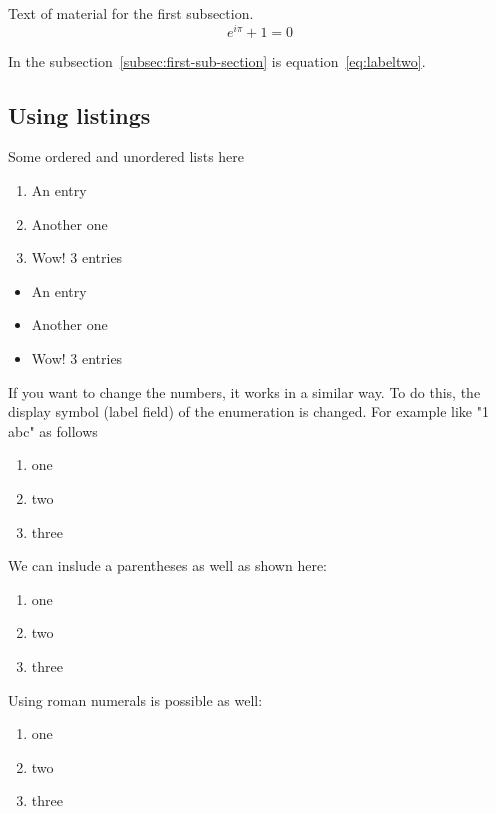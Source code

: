 \documentclass[12]{article}
\begin{document}
    Text of material for the first subsection.
    \begin{equation}
      e^{i\pi}+1 = 0
    \label{eq:labeltwo}
    \end{equation}

    In the subsection~\ref{subsec:first-sub-section} is equation~\ref{eq:labeltwo}.

    \subsection{Using listings}%
    \label{sub:listings}
    Some ordered and unordered lists here

    \begin{enumerate}
        \item An entry
        \item Another one
        \item Wow! 3 entries
    \end{enumerate}

    \begin{itemize}
        \item An entry
        \item Another one
        \item Wow! 3 entries
    \end{itemize}

    If you want to change the numbers, it works in a similar way. To do this, the display symbol (label field) of the enumeration is changed. For example like "1 abc" as follows

    \renewcommand{\labelenumi}{\alph{enumi}}
    \begin{enumerate}
    \item one
    \item two
    \item three
    \end{enumerate}

    We can inslude a parentheses as well as shown here:

    \renewcommand{\labelenumi}{\alph{enumi})}
    \begin{enumerate}
    \item one
    \item two
    \item three
    \end{enumerate}

    Using \textrm{roman} numerals is possible as well:

    \renewcommand{\labelenumi}{\roman{enumi}}
    \begin{enumerate}
    \item one
    \item two
    \item three
    \end{enumerate}
\end{document}
